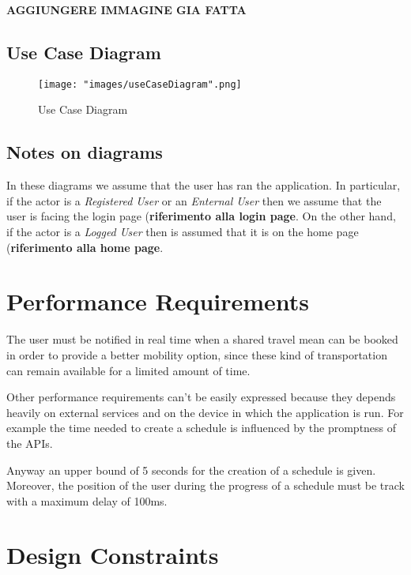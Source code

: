 \textbf{AGGIUNGERE IMMAGINE GIA FATTA}

\subsection{Use Case Diagram}

\begin{figure}[H]
\begin{center}
\texttt{[image: "images/useCaseDiagram".png]}
\caption{Use Case Diagram}
\label{img:seqDiagrPasswordRecovery}
\end{center}
\end{figure}

\subsection{Notes on diagrams}
In these diagrams we assume that the user has ran the application. In particular, if the actor is a \textit{Registered User} or an \textit{Enternal User} then we assume that the user is facing the login page (\textbf{riferimento alla login page}. On the other hand, if the actor is a \textit{Logged User} then is assumed that it is on the home page (\textbf{riferimento alla home page}.

\section{Performance Requirements}
The user must be notified in real time when a shared travel mean can be booked in order to provide a better mobility option,
since these kind of transportation can remain available for a limited amount of time.

Other performance requirements can't be easily expressed because they depends heavily on external services and on the device in which the application is run. For example the time needed to create a schedule is influenced by the promptness of the APIs.

Anyway an upper bound of 5 seconds for the creation of a schedule is given. Moreover, the position of the user during the progress of a schedule must be track with a maximum delay of 100ms.

\section{Design Constraints}


